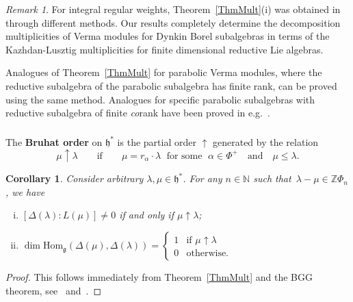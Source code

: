\documentclass[11pt]{amsart}
\newcommand{\rR}{\Phi}
\newcommand{\Hom}{\mathrm{Hom}}
\newcommand{\fg}{\mathfrak{g}}
\newcommand{\fh}{\mathfrak{h}}
\newcommand{\mN}{\mathbb{N}}
\newcommand{\mZ}{\mathbb{Z}}
\numberwithin{equation}{section}
\theoremstyle{plain}
\newtheorem{cor}[subsubsection]{Corollary}
\theoremstyle{remark}
\newtheorem{rem}[subsubsection]{Remark}
\theoremstyle{remark}
\theoremstyle{construction}
\begin{document}
\begin{rem}For integral regular weights, Theorem~\ref{ThmMult}(i) was obtained in \cite[Proposition~3.6]{Nam} through different methods. Our results completely determine the decomposition multiplicities of Verma modules for Dynkin Borel subalgebras in terms of the Kazhdan-Lusztig multiplicities for finite dimensional reductive Lie algebras.


Analogues of Theorem~\ref{ThmMult} for parabolic Verma modules, where the reductive subalgebra of the parabolic subalgebra has finite rank, can be proved using the same method. Analogues for specific parabolic subalgebras with reductive subalgebra of finite {\em co}rank have been proved in e.g.~\cite{CLW, CWZ}.
\end{rem}


\subsubsection{} The {\bf Bruhat order} on $\fh^\ast$ is the partial order $\uparrow$ generated by the relation
$$\mu\uparrow \lambda\qquad\mbox{if}\qquad \mu=r_\alpha\cdot\lambda \;\mbox{ for some }\;\alpha\in \Phi^+\quad\mbox{and}\quad \mu\le \lambda.$$

\begin{cor}\label{CorBGGThm}
Consider arbitrary $\lambda,\mu\in\fh^\ast$. For any $n\in\mN$ such that~$\lambda-\mu \in\mZ\rR_n$, we have
\begin{enumerate}[(i)]
\item $[\Delta(\lambda):L(\mu)]\not=0$ if and only if $\mu\uparrow \lambda$;
\item  $\dim\Hom_{\fg}(\Delta(\mu),\Delta(\lambda))=\begin{cases}1&\mbox{if $\mu\uparrow\lambda$}\\
0&\mbox{otherwise.}\end{cases}$
\end{enumerate}
\end{cor}
\begin{proof}
This follows immediately from Theorem~\ref{ThmMult} and the BGG theorem, see~\cite[Theorem~5.1]{Humphreys} and~\cite[Theorem~4.2(b)]{Humphreys}.
\end{proof}

\end{document}
